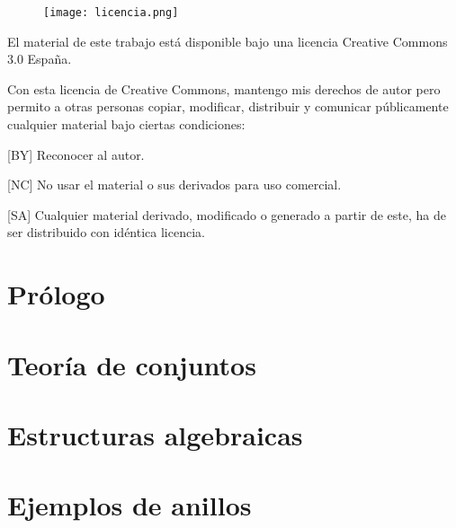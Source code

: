\documentclass{article}
\theoremstyle{theorem-style}  %
\theoremstyle{definition-style}
\theoremstyle{example-style}
\begin{document}


\makeatletter\renewcommand{\ALG@name}{Algoritmo}

\maketitle



\newpage
\tableofcontents
\newpage

\begin{figure}
\centering
\texttt{[image: licencia.png]}
\end{figure}

El material de este trabajo está disponible bajo una licencia Creative Commons 3.0 España.

Con esta licencia de Creative Commons, mantengo mis derechos de autor pero permito a otras personas copiar, modificar, distribuir y comunicar públicamente cualquier material bajo ciertas condiciones:

[BY] Reconocer al autor. 

[NC] No usar el material o sus derivados para uso comercial. 
    
[SA] Cualquier material derivado, modificado o generado a partir de este, ha de ser distribuido con idéntica licencia. 
    


\newpage
\section{Prólogo}

\pagebreak
\section{Teoría de conjuntos}

\pagebreak
\section{Estructuras algebraicas}

\pagebreak
\section{Ejemplos de anillos}

\pagebreak
\end{document}
